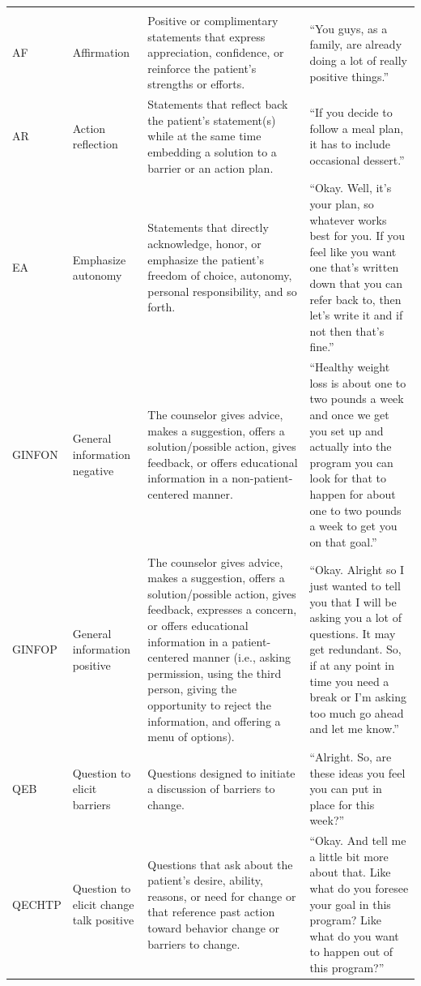 \begin{small}
\begin{longtable}{p{1.3cm}p{2cm}p{5cm}p{4.8cm}}
\rowcolor{lightgraycol}
\noalign{\smallskip}
\multicolumn{4}{l}{\textbf{Counselor}} \\
\noalign{\smallskip}
AF & Affirmation & Positive or complimentary statements that express appreciation, confidence, or reinforce the patient’s strengths or efforts. & ``You guys, as a family, are already doing a lot of really positive things.'' \\
AR & Action reflection & Statements that reflect back the patient’s statement(s) while at the same time embedding a solution to a barrier or an action plan. & ``If you decide to follow a meal plan, it has to include occasional dessert.'' \\
EA & Emphasize autonomy & Statements that directly acknowledge, honor, or emphasize the patient’s freedom of choice, autonomy, personal responsibility, and so forth. & ``Okay. Well, it’s your plan, so whatever works best for you. If you feel like you want one that’s written down that you can refer back to, then let’s write it and if not then that’s fine.''\\
GINFON & General information negative & The counselor gives advice, makes a suggestion, offers a solution/possible action, gives feedback, or offers educational information in a non-patient-centered manner. & ``Healthy weight loss is about one to two pounds a week and once we get you set up and actually into the program you can look for that to happen for about one to two pounds a week to get you on that goal.''\\
GINFOP & General information positive & The counselor gives advice, makes a suggestion, offers a solution/possible action, gives feedback, expresses a concern, or offers educational information in a patient-centered manner (i.e., asking permission, using the third person, giving the opportunity to reject the information, and offering a menu of options). & ``Okay.  Alright so I just wanted to tell you that I will be asking you a lot of questions.  It may get redundant.  So, if at any point in time you need a break or I’m asking too much go ahead and let me know.''\\
QEB & Question to elicit barriers & Questions designed to initiate a discussion of barriers to change. & ``Alright.  So, are these ideas you feel you can put in place for this week?''\\
QECHTP & Question to elicit change talk positive & Questions that ask about the patient’s desire, ability, reasons, or need for change or that reference past action toward behavior change or barriers to change. & ``Okay.  And tell me a little bit more about that.  Like what do you foresee your goal in this program?  Like what do you want to happen out of this program?''\\

\end{longtable}
\end{small}
